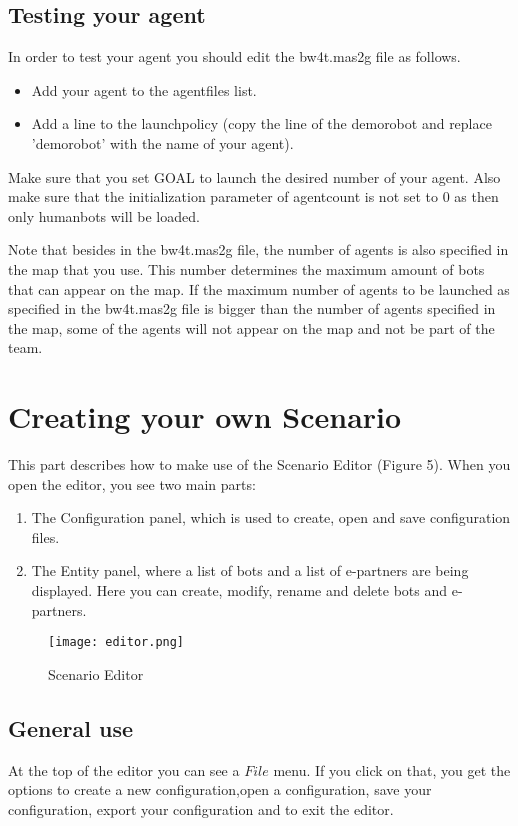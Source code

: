 \documentclass[11pt,a4paper]{article}
\begin{document}
\subsection{Testing your agent}
In order to test your agent you should edit the bw4t.mas2g file as follows.
\begin{itemize}
\item Add your agent to the agentfiles list.
\item Add a line to the launchpolicy (copy the line of the demorobot and replace 'demorobot' with the name of your agent).
\end{itemize}
Make sure that you set GOAL to launch the desired number of your agent. Also make sure that the initialization parameter of agentcount is not set to 0 as then only humanbots will be loaded.

Note that besides in the bw4t.mas2g file, the number of agents is also specified in the map that you use. This number determines the maximum amount of bots that can appear on the map. If the maximum number of agents to be launched as specified in the bw4t.mas2g file is bigger than the number of agents specified in the map, some of the agents will not appear on the map and not be part of the team. 

\section{Creating your own Scenario}
This part describes how to make use of the Scenario Editor (Figure 5). When you open the editor, you see two main parts:
\begin{enumerate}
\item The Configuration panel, which is used to create, open and save configuration files.
\item The Entity panel, where a list of bots and a list of e-partners are being displayed. Here you can create, modify, rename and delete bots and e-partners.
\end{enumerate}

\begin{figure}[h]
\begin{center}
\texttt{[image: editor.png]}
\caption{Scenario Editor}
\end{center}
\end{figure}

\subsection{General use}
At the top of the editor you can see a $File$ menu. If you click on that, you get the options to create a new configuration,open a configuration, save your configuration, export your configuration and to exit the editor.
\end{document}
